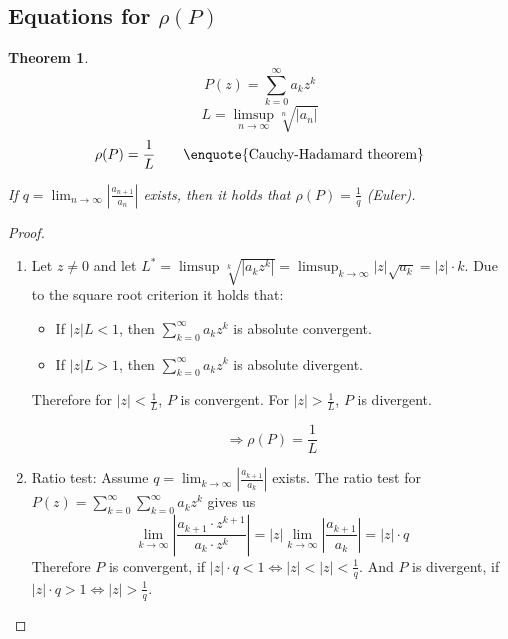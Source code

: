 \documentclass[a4paper,landscape,twocolumn]{article}
\newtheorem{theorem}{Theorem}
\newcommand\abs[1]{\left|#1\right|}
\begin{document}
\subsection{Equations for $\rho(P)$}
%
\begin{theorem}
  \[ P(z) = \sum_{k=0}^\infty a_k z^k \]
  \[ L = \limsup_{n\to\infty} \sqrt[n]{\abs{a_n}} \]
  \[ \rho(P) = \frac{1}{L} \qquad \text{\enquote{Cauchy-Hadamard theorem}} \]

  If $q = \lim_{n\to\infty} \abs{\frac{a_{n+1}}{a_n}}$ exists,
  then it holds that $\rho(P) = \frac1q$ (Euler).

\end{theorem}
\begin{proof}
  \begin{enumerate}
    \item
      Let $z \neq 0$ and let $L^* = \limsup{\sqrt[k]{\abs{a_k z^k}}} = \limsup_{k\to\infty}{\abs{z}\sqrt{a_k}} = \abs{z} \cdot k$.
      Due to the square root criterion it holds that:
      \begin{itemize}
        \item If $\abs{z} L < 1$, then $\sum_{k=0}^\infty a_k z^k$ is absolute convergent.
        \item If $\abs{z} L > 1$, then $\sum_{k=0}^\infty a_k z^k$ is absolute divergent.
      \end{itemize}

      Therefore for $\abs{z} < \frac1{L}$, $P$ is convergent.
      For $\abs{z} > \frac{1}{L}$, $P$ is divergent.

      \[ \Rightarrow \rho(P) = \frac{1}{L} \]
    \item Ratio test: Assume $q = \lim_{k\to\infty} \abs{\frac{a_{k+1}}{a_k}}$ exists.
      The ratio test for $P(z) = \sum_{k=0}^\infty \sum_{k=0}^\infty a_k z^k$ gives us
      \[
        \lim_{k\to\infty} \abs{\frac{a_{k+1} \cdot z^{k+1}}{a_k \cdot z^k}}
        = \abs{z} \lim_{k\to\infty} \abs{\frac{a_{k+1}}{a_k}}
        = \abs{z} \cdot q
      \]
      Therefore $P$ is convergent, if $\abs{z} \cdot q < 1 \Leftrightarrow \abs{z} < \abs{z} < \frac1{q}$.
      And $P$ is divergent, if $\abs{z} \cdot q > 1 \Leftrightarrow \abs{z} > \frac1{q}$.
  \end{enumerate}
\end{proof}
\end{document}
